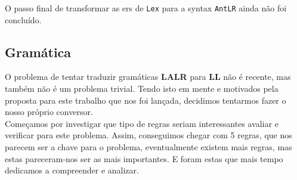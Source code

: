 \documentclass[11pt,a4paper]{article}
\begin{document}
O passo final de transformar as ers de \texttt{Lex} para a syntax \texttt{AntLR} ainda não foi concluído.

\subsection{Gramática}
O problema de tentar traduzir gramáticas \textbf{LALR} para \textbf{LL} não é recente, mas também não é um problema trivial. Tendo isto em mente e motivados pela proposta
para este trabalho que nos foi lançada, decidimos tentarmos fazer o nosso próprio conversor.\\
Começamos por investigar que tipo de regras seriam interessantes avaliar e verificar para este problema. Assim, conseguimos chegar com 5 regras, que nos parecem ser a chave
para o problema, eventualmente existem mais regras, mas estas pareceram-nos ser as mais importantes. E foram estas que mais tempo dedicamos a compreender e analizar.
\end{document}
